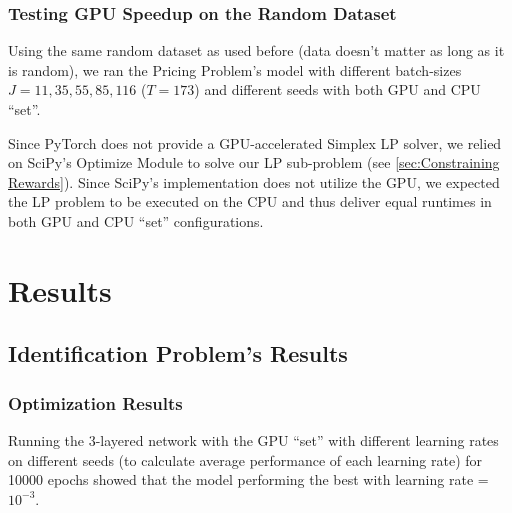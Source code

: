 \documentclass[12pt]{article}
\begin{document}
    \subsubsection{Testing GPU Speedup on the Random Dataset} \label{sec:Pricing Problem-Testing GPU Speedup on the Random Dataset}
    Using the same random dataset as used before (data doesn't matter as long as it is random), we ran the Pricing Problem's model with different batch-sizes $J = 11, 35, 55, 85, 116$ ($T = 173$) and different seeds with both GPU and CPU ``set''.
    
    Since PyTorch does not provide a GPU-accelerated Simplex LP solver, we relied on SciPy's Optimize Module to solve our LP sub-problem (see \cref{sec:Constraining Rewards}). Since SciPy's implementation does not utilize the GPU, we expected the LP problem to be executed on the CPU and thus deliver equal runtimes in both GPU and CPU ``set'' configurations.
    
    \section{Results} \label{sec:Results}
    \subsection{Identification Problem's Results} \label{sec:Identification Problem's Results}
    \subsubsection{Optimization Results} \label{sec:IdProbRes - Optimization}
    Running the 3-layered network with the GPU ``set'' with different learning rates on different seeds (to calculate average performance of each learning rate) for 10000 epochs showed that the model performing the best with learning rate = $10^{-3}$. 
    
\end{document}
